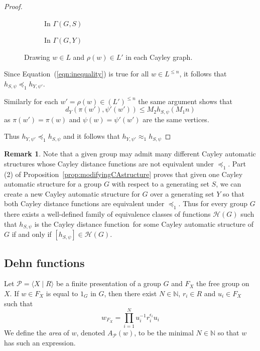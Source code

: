 \documentclass[11pt]{amsart}
\newcommand{\preceqF}{\preceq_1}
\newcommand{\approxF}{\approx_1}
\theoremstyle{definition}
\newtheorem{remark}[theorem]{Remark}
\newcommand\N{\mathbb N}
\newcommand\distfun{Cayley distance function}
\begin{document}
\begin{proof}
\begin{figure}[h!]
\begin{subfigure}{.45\textwidth}
  \centering
 
  \caption{In $\Gamma(G,S)$}
  \label{fig:sub-first}
\end{subfigure}
\begin{subfigure}{.45\textwidth}
  \centering

  \caption{In $\Gamma(G,Y)$}
  \label{fig:sub-second}
\end{subfigure}
\caption{Drawing  $w\in L$  and $\rho(w)\in L'$ in each  Cayley graph.}
\label{fig:quasiIsom}
\end{figure}



Since Equation~(\ref{eqn:inequality}) is true for all $w\in L^{\leq n}$, it follows that
 $h_{S,\psi}\preceqF h_{Y,\psi'} $.


Similarly
 for each $w'=\rho(w)\in (L')^{\leq n}$  the same argument shows that \[d_Y\left(\pi(w'), \psi'(w')\right)
 \leq
 M_2h_{S,\psi}\left(M_1n\right)
 \] as $\pi(w')=\pi(w)$ and $\psi(w)=\psi'(w')$ are the same vertices.


 Thus $h_{Y,\psi'}\preceqF h_{S,\psi}$ and it follows that  $h_{Y,\psi'}\approxF h_{S,\psi}$
\end{proof}

\begin{remark}
Note that a given group may admit many different Cayley automatic structures whose \distfun s are not equivalent under $\preceqF$.  Part (2) of Proposition~\ref{prop:modifyingCAstructure} proves that given one Cayley automatic structure for a group $G$ with respect to a generating set $S$,  we can create a new Cayley automatic structure for $G$ over a generating set $Y$ so that both \distfun s are equivalent under $\preceqF$.
Thus for every group $G$ there exists a well-defined  family of equivalence classes of functions $\mathcal H(G)$
such that $h_{S,\psi}$ is the \distfun\ for some Cayley automatic structure of $G$ if and only if $[h_{S,\psi}]\in \mathcal H(G)$.
\end{remark}






\subsection{Dehn functions}\label{subsec:Dehn}


Let $\mathcal P=\langle X\mid  R\rangle $ be a finite presentation of a group $G$ and $F_X$ the free group on $X$. If $w\in F_X$ is equal to $1_G$ in $G$, then
there exist $N\in \N$, $r_i\in R$ and $u_i\in F_X$ such that
\[w_{F_X}=\prod_{i=1}^N  u_i^{-1}r_i^{\epsilon_i}u_i
\]
We define the {\em area} of $w$,  denoted $A_{\mathcal P}(w)$,  to be the minimal $N\in \N$ so that $w$ has such an expression.
\end{document}
